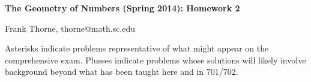 \documentclass[12pt]{article}
\begin{document}
\setlength{\topmargin}{-2mm}





\begin{center}{\bf The Geometry of Numbers (Spring 2014): Homework 2}
\end{center}
\begin{center}Frank Thorne, thorne@math.sc.edu
\end{center}

Asterisks indicate problems representative of what might appear on the comprehensive exam.
Plusses indicate problems whose solutions will likely involve background beyond what has been taught here
and in 701/702.
\\
\\
\end{document}
